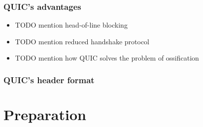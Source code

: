 \documentclass[12pt,a4paper,twoside,openright]{report}
\begin{document}
\subsection{QUIC's advantages}

\begin{itemize}
  \item TODO mention head-of-line blocking
  \item TODO mention reduced handshake protocol
  \item TODO mention how QUIC solves the problem of ossification
\end{itemize}

\subsection{QUIC's header format}







\chapter{Preparation}
%


\end{document}
